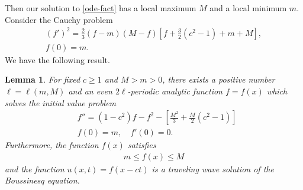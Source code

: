 \documentclass[12pt,reqno]{amsart}
\numberwithin{equation}{section}  %
\newtheorem{lemma}[theorem]{Lemma}
\begin{document}
Then our solution to \eqref{ode-fact} has a
local maximum $M$ and a local minimum $m$. Consider the Cauchy problem
%
\begin{gather}
  \label{ode-cauchy}
   \left ( f'\right )^{2}
  = \frac{2}{3} \left (f-m\right )
  \left(M-f \right )
  \left [ f + \frac{3}{2}(c^{2} -1) +m +M \right ],
  \\
\label{ode-cauchy-data}
   f(0) = m.
\end{gather}
%
%
We have the following result.
%
%
%
%
%                
%
%
%
%
\begin{lemma}
  For fixed $c \ge 1$ and $M > m > 0$,  there exists a positive
  number $\ell = \ell(m, M)$ and an even $2\ell$-periodic analytic function $f =
  f(x)$ which solves the initial value problem
\begin{align}
  \label{2nd-order-ode}
& f'' = (1-c^{2})f - f^{2} - \left [\frac{M^{2}}{3} + \frac{M}{2}(c^{2}-1)
\right]
\\
\label{2nd-order-ode-data}
& f(0)=m, \quad f'(0) = 0.
\end{align}
Furthermore, the function
  $f(x)$ satisfies
  \begin{equation}
    \label{f-bound}
  \begin{split}
  m \le f(x) \le M
  \end{split}
  \end{equation}
  and the function $u(x,t) = f(x-ct)$ is a traveling wave solution of the
  Boussinesq equation. 
\label{lem:ode-solution}
\end{lemma}
%
%
%
\end{document}
